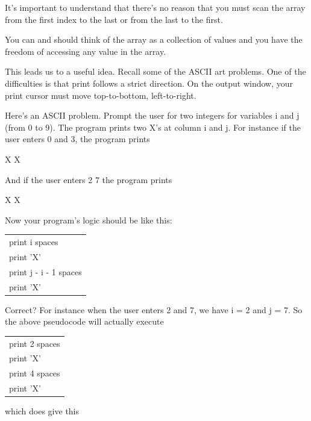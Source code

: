 

\newpage{}

It's important to understand that there's no reason that you must scan the array from the first index to the last or from the last to the first.

You can and should think of the array as a collection of values and you have the freedom of accessing any value in the array.

This leads us to a useful idea. Recall some of the ASCII art problems. One of the difficulties is that print follows a strict direction. On the output window, your print cursor must move top-to-bottom, left-to-right.

Here's an ASCII problem. Prompt the user for two integers for variables i and j (from 0 to 9). The program prints two X's at column i and j. For instance if the user enters 0 and 3, the program prints

\begin{consolethree}
X X 
\end{consolethree}

And if the user enters 2 7 the program prints

\begin{consolethree}
 X     X 
\end{consolethree}

Now your program's logic should be like this:\\

\begin{tabular}{l}
print i spaces\\
print 'X'\\
print j - i - 1 spaces\\
print 'X'\\
\end{tabular}

Correct? For instance when the user enters 2 and 7, we have i = 2 and j = 7. So the above pseudocode will actually execute\\

\begin{tabular}{l}
print 2 spaces\\
print 'X'\\
print 4 spaces\\
print 'X'\\
\end{tabular}

which does give this

